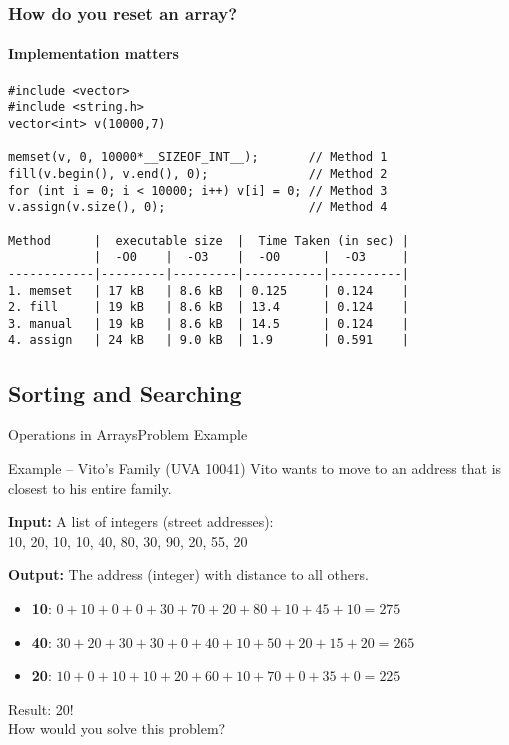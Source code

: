\begin{frame}[fragile]
  \frametitle{How do you reset an array?}
  \framesubtitle{Implementation matters}
{\smaller
\begin{verbatim}
#include <vector>
#include <string.h>
vector<int> v(10000,7)

memset(v, 0, 10000*__SIZEOF_INT__);       // Method 1
fill(v.begin(), v.end(), 0);              // Method 2
for (int i = 0; i < 10000; i++) v[i] = 0; // Method 3
v.assign(v.size(), 0);                    // Method 4

Method      |  executable size  |  Time Taken (in sec) |
            |  -O0    |  -O3    |  -O0      |  -O3     |
------------|---------|---------|-----------|----------|
1. memset   | 17 kB   | 8.6 kB  | 0.125     | 0.124    |
2. fill     | 19 kB   | 8.6 kB  | 13.4      | 0.124    |
3. manual   | 19 kB   | 8.6 kB  | 14.5      | 0.124    |
4. assign   | 24 kB   | 9.0 kB  | 1.9       | 0.591    |
\end{verbatim}
}
\end{frame}

\subsection{Sorting and Searching}

\begin{frame}{Operations in Arrays}{Problem Example}

  \begin{block}{Example -- Vito's Family (UVA 10041)}
    Vito wants to move to an address that is closest to his entire family.
  \end{block}
  \bigskip

  {\bf Input:} A list of integers (street addresses):\\
  10, 20, 10, 10, 40, 80, 30, 90, 20, 55, 20
  \bigskip

  {\bf Output:} The address (integer) with  distance to all others.
  \begin{itemize}
    \item {\bf 10}: $0+10+0+0+30+70+20+80+10+45+10 = 275$
    \item {\bf 40}: $30+20+30+30+0+40+10+50+20+15+20 = 265$
    \item {\bf 20}: $10+0+10+10+20+60+10+70+0+35+0 = 225$
  \end{itemize}
  \bigskip

  Result: 20!\\
  How would you solve this problem?
\end{frame}

